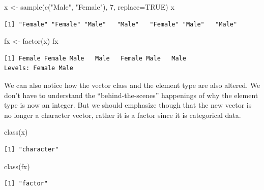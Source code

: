 \documentclass[
  letterpaper,
  DIV=11,
  numbers=noendperiod]{scrreprt}
\newenvironment{Shaded}{\begin{snugshade}}{\end{snugshade}}
\newcommand{\AttributeTok}[1]{\textcolor[rgb]{0.40,0.45,0.13}{#1}}
\newcommand{\ConstantTok}[1]{\textcolor[rgb]{0.56,0.35,0.01}{#1}}
\newcommand{\DecValTok}[1]{\textcolor[rgb]{0.68,0.00,0.00}{#1}}
\newcommand{\FunctionTok}[1]{\textcolor[rgb]{0.28,0.35,0.67}{#1}}
\newcommand{\NormalTok}[1]{\textcolor[rgb]{0.00,0.23,0.31}{#1}}
\newcommand{\OtherTok}[1]{\textcolor[rgb]{0.00,0.23,0.31}{#1}}
\newcommand{\StringTok}[1]{\textcolor[rgb]{0.13,0.47,0.30}{#1}}
\begin{document}
\begin{Shaded}
\begin{Highlighting}[]
\NormalTok{x }\OtherTok{\textless{}{-}} \FunctionTok{sample}\NormalTok{(}\FunctionTok{c}\NormalTok{(}\StringTok{"Male"}\NormalTok{, }\StringTok{"Female"}\NormalTok{), }\DecValTok{7}\NormalTok{, }\AttributeTok{replace=}\ConstantTok{TRUE}\NormalTok{)}
\NormalTok{x}
\end{Highlighting}
\end{Shaded}

\begin{verbatim}
[1] "Female" "Female" "Male"   "Male"   "Female" "Male"   "Male"  
\end{verbatim}

\begin{Shaded}
\begin{Highlighting}[]
\NormalTok{fx }\OtherTok{\textless{}{-}} \FunctionTok{factor}\NormalTok{(x)}
\NormalTok{fx}
\end{Highlighting}
\end{Shaded}

\begin{verbatim}
[1] Female Female Male   Male   Female Male   Male  
Levels: Female Male
\end{verbatim}

We can also notice how the vector class and the element type are also
altered. We don't have to understand the ``behind-the-scenes''
happenings of why the element type is now an integer. But we should
emphasize though that the new vector is no longer a character vector,
rather it is a factor since it is categorical data.

\begin{Shaded}
\begin{Highlighting}[]
\FunctionTok{class}\NormalTok{(x)}
\end{Highlighting}
\end{Shaded}

\begin{verbatim}
[1] "character"
\end{verbatim}

\begin{Shaded}
\begin{Highlighting}[]
\FunctionTok{class}\NormalTok{(fx)}
\end{Highlighting}
\end{Shaded}

\begin{verbatim}
[1] "factor"
\end{verbatim}
\end{document}
